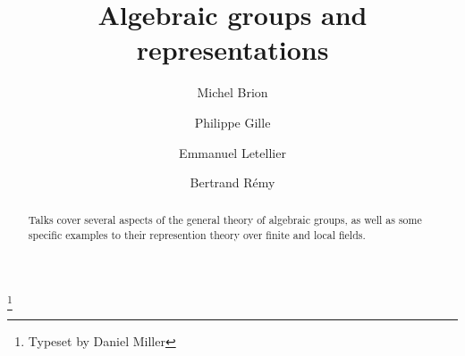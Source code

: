 \documentclass[english,letterpaper]{smfart}
\author{Michel Brion}
\author{Philippe Gille}
\author{Emmanuel Letellier}
\author{Bertrand R\'emy}
\title[Algebraic groups]{Algebraic groups and representations}
\begin{document}
\frontmatter

\begin{abstract}
Talks cover several aspects of the general theory of algebraic groups, as well 
as some specific examples to their represention theory over finite and local 
fields. 
\end{abstract}

\thanks{Typeset by Daniel Miller}

\maketitle
\tableofcontents
\mainmatter













\backmatter


\end{document}
